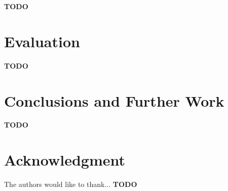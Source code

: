 \documentclass[conference]{IEEEtran}
\newcommand{\TODO}{\textbf{\color{red}TODO}}
\begin{document}
\TODO

\section{Evaluation}

\TODO

\section{Conclusions and Further Work}

\TODO


\section*{Acknowledgment}

The authors would like to thank... \TODO




\end{document}
